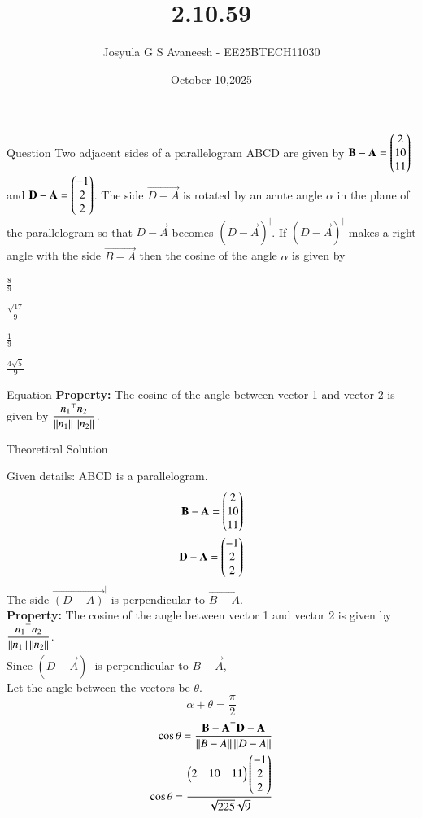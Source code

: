 \documentclass{beamer}
\title %
{2.10.59}
\date{October 10,2025}
\author 
{Josyula G S Avaneesh - EE25BTECH11030}
\begin{document}
\frame{\titlepage}
\begin{frame}{Question}
Two adjacent sides of a parallelogram ABCD are given by $\mathbf{B-A}=\begin{pmatrix}2\\10\\11\end{pmatrix}$ and $\mathbf{D-A}=\begin{pmatrix}-1\\2\\2\end{pmatrix}$. The side $\vec{D-A}$ is rotated by an acute angle $\alpha$ in the plane of the parallelogram so that $\vec{D-A}$ becomes $(\vec{D-A})^|$. If $(\vec{D-A})^|$ makes a right angle with the side $\vec{B-A}$ then the cosine of the angle $\alpha$ is given by\\
\begin{enumerate}
\begin{multicols}{2}
    \item $\frac{8}{9}$
    \item $\frac{\sqrt{17}}{9}$
    \item $\frac{1}{9}$
    \item $\frac{4 \sqrt{5}}{9}$
\end{multicols}
\end{enumerate}
\end{frame}



\begin{frame}{Equation}
\textbf{Property:} The cosine of the angle between vector 1 and vector 2 is given by $\dfrac{{n_1}^\top n_2}{\left\lVert n_1\right\rVert\left\lVert n_2\right\rVert} $.
\end{frame}
\begin{frame}{Theoretical Solution}

Given details:
ABCD is a parallelogram.
\begin{align}
   \mathbf{B-A}=\begin{pmatrix}2\\10\\11\end{pmatrix}\\
   \mathbf{D-A}=\begin{pmatrix}-1\\2\\2\end{pmatrix}
\end{align}
The side $\vec{(D-A)}^|$ is perpendicular to $\vec{B-A}$.\\
\textbf{Property:} The cosine of the angle between vector 1 and vector 2 is given by $\dfrac{{n_1}^\top n_2}{\left\lVert n_1\right\rVert\left\lVert n_2\right\rVert} $.\\
Since $(\vec{D-A})^|$ is perpendicular to $\vec{B-A}$,\\


Let the angle between the vectors be $\theta$.
$$\alpha+\theta=\frac{\pi}{2}$$
\begin{align}
  \cos\theta=\frac{\mathbf{B-A}^\top\mathbf{D-A}}{\left\lVert B-A\right\rVert\left\lVert D-A\right\rVert}\\
  \cos\theta=\frac{\begin{pmatrix}2&10&11\end{pmatrix}\begin{pmatrix}-1\\2\\2\end{pmatrix}}{\sqrt{225}\sqrt{9}}\\
\end{align}
\end{frame}
\end{document}
